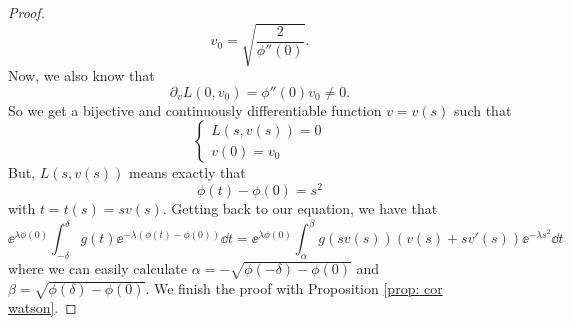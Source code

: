 \begin{proof}
	\begin{equation}
		v_0 = \sqrt{\frac{2}{\phi''(0)}}.
	\end{equation}
	Now, we also know that
	\begin{equation}
		\partial_v L(0, v_0) = \phi''(0) v_0 \neq 0.
	\end{equation}
	So we get a bijective and continuously differentiable function $v = v(s)$ such that
	\begin{equation}
		\begin{cases}
			L(s, v(s)) = 0 \\
			v(0) = v_0
		\end{cases}
	\end{equation}
	But, $L(s, v(s))$ means exactly that
	\begin{equation}
		\phi(t) - \phi(0) = s^2
	\end{equation}
	with $t = t(s) = sv(s)$. Getting back to our equation, we have that
	\begin{equation}
		\ee^{\lambda \phi(0)} \int_{-\delta}^{\delta} g(t) \ee^{-\lambda (\phi(t)-\phi(0))} \dd t = \ee^{\lambda \phi(0)} \int_{\alpha}^{\beta} g(sv(s)) (v(s) + sv'(s)) \ee^{-\lambda s^2} \dd t
	\end{equation}
	where we can easily calculate $\alpha = - \sqrt{\phi(-\delta) - \phi(0)}$ and $\beta = \sqrt{\phi(\delta) - \phi(0)}$. We finish the proof with Proposition \ref{prop: cor watson}.
\end{proof}

